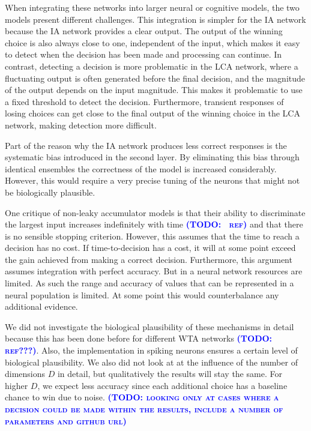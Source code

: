 \documentclass[10pt,letterpaper]{article}
\makeatletter
\newcommand{\todo}[1]{\textbf{\textsc{\textcolor{blue}{(TODO\@: #1)}}}}
\makeatother
\begin{document}
When integrating these networks into larger neural or cognitive models, the two models present different challenges.
This integration is simpler for the IA network because the IA network provides a clear output.
The output of the winning choice is also always close to one, independent of the input, which makes it easy to detect when the decision has been made and processing can continue.
In contrast, detecting a decision is more problematic in the LCA network, where  a fluctuating output is often generated before the final decision, and the magnitude of the output depends on the input magnitude.
This makes it problematic to use a fixed threshold to detect the decision.
Furthermore, transient responses of losing choices can get close to the final output of the winning choice in the LCA network, making detection more difficult.

Part of the reason why the IA network produces less correct responses is the systematic bias introduced in the second layer.
By eliminating this bias through identical ensembles the correctness of the model is increased considerably.
However, this would require a very precise tuning of the neurons that might not be biologically plausible.

One critique of non-leaky accumulator models is that their ability to discriminate the largest input increases indefinitely with time \todo{~ref} and that there is no sensible stopping criterion.
However, this assumes that the time to reach a decision has no cost.
If time-to-decision has a cost, it will at some point exceed the gain achieved from making a correct decision.
Furthermore, this argument assumes integration with perfect accuracy.
But in a neural network resources are limited. As such the range and accuracy of values that can be represented in a neural population is limited.
At some point this would counterbalance any additional evidence.

We did not investigate the biological plausibility of these mechanisms in detail because this has been done before for different WTA networks \todo{ref???}.
Also, the implementation in spiking neurons ensures a certain level of biological plausibility.
We also did not look at at the influence of the number of dimensions $D$ in detail, but qualitatively the results will stay the same.
For higher $D$, we expect less accuracy since each additional choice has a baseline chance to win due to noise.
\todo{looking only at cases where a decision could be made within the results, include a number of parameters and github url}
\end{document}
